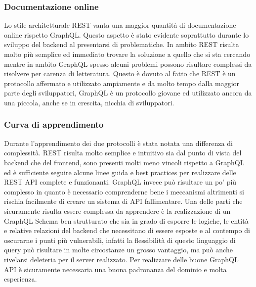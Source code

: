 \subsubsection*{Documentazione online}
Lo stile architetturale REST vanta una maggior quantità di documentazione online rispetto GraphQL. Questo aspetto è stato evidente soprattutto durante lo sviluppo del backend al presentarsi di problematiche. In ambito REST risulta molto più semplice ed immediato trovare la soluzione a quello che si sta cercando mentre in ambito GraphQL spesso alcuni problemi possono risultare complessi da risolvere per carenza di letteratura. Questo è dovuto al fatto che REST è un protocollo affermato e utilizzato ampiamente e da molto tempo dalla maggior parte degli sviluppatori, GraphQL è un protocollo giovane ed utilizzato ancora da una piccola, anche se in crescita, nicchia di sviluppatori.
\subsubsection*{Curva di apprendimento}
Durante l'apprendimento dei due protocolli è stata notata una differenza di complessità. REST risulta molto semplice e intuitivo sia dal punto di vista del backend che del frontend, sono presenti molti meno vincoli rispetto a GraphQL ed è sufficiente seguire alcune linee guida e best practices per realizzare delle REST API complete e funzionanti. GraphQL invece può risultare un po' più complesso in quanto è necessario comprenderne bene i meccanismi altrimenti si rischia facilmente di creare un sistema di API fallimentare. Una delle parti che sicuramente risulta essere complessa da apprendere è la realizzazione di un GraphQL Schema ben strutturato che sia in grado di esporre le logiche, le entità e relative relazioni del backend che necessitano di essere esposte e al contempo di oscurarne i punti più vulnerabili, infatti la flessibilità di questo linguaggio di query può risultare in molte circostanze un grosso vantaggio, ma può anche rivelarsi deleteria per il server realizzato. Per realizzare delle buone GraphQL API è sicuramente necessaria una buona padronanza del dominio e molta esperienza.
